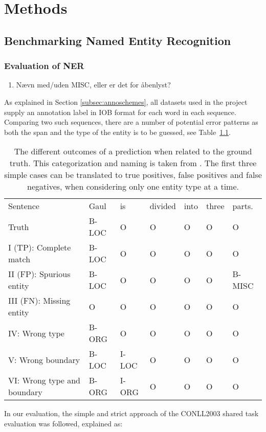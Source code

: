 \documentclass[main.tex]{subfiles}
\begin{document}
\chapter{Methods}
\label{chap:methods}

\section{Benchmarking Named Entity Recognition}
\subsection{Evaluation of NER}
\label{subsec:nereval}
\begin{enumerate}
    \item Nævn med/uden MISC, eller er det for åbenlyst?
\end{enumerate}
As explained in Section \ref{subsec:annoschemes}, all datasets used in the project supply an annotation label in IOB format \cite{ramshaw1995IOB} for each word in each sequence.
Comparing two such sequences, there are a number of potential error patterns as both the span and the type of the entity is to be guessed, see Table~\ref{tab:eval}.
\begin{table}[H]
    \footnotesize
    \centering
    \begin{tabular}{l|llllll}
        Sentence                    & Gaul & is & divided & into & three & parts.\\
        Truth                       & B-LOC & O & O & O & O & O \\\hline
        I (TP): Complete match      & B-LOC & O & O & O & O & O \\
        II (FP): Spurious entity    & B-LOC & O & O & O & O & B-MISC \\
        III (FN): Missing entity    & O     & O & O & O & O & O \\
        IV: Wrong type              & B-ORG & O & O & O & O & O \\
        V: Wrong boundary           & B-LOC & I-LOC & O & O & O & O \\
        VI: Wrong type and boundary & B-ORG & I-ORG & O & O & O & O
    \end{tabular}
    \caption{
        The different outcomes of a prediction when related to the ground truth.
        This categorization and naming is taken from \cite{batista2018eval}.
        The first three simple cases can be translated to true positives, false positives and false negatives, when considering only one entity type at a time.
    }
    \label{tab:eval}
\end{table}\noindent
In our evaluation, the simple and strict approach of the CONLL2003 shared task evaluation was followed, explained as:
\end{document}
